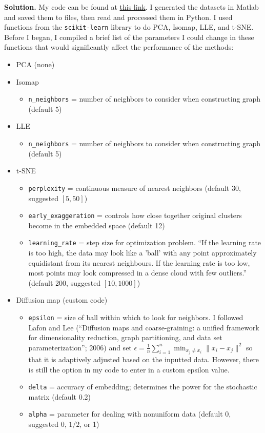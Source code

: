 \documentclass{letter}
\newcounter{problem}
\newcommand{\Solution}[1]{%
	\textbf{Solution.} #1 \par%
}
\begin{document}
    \Solution{My code can be found at \href{https://github.com/thoffman1/amsc808n}{this link}. I generated the datasets in Matlab and saved them to files, then read and processed them in Python. I used functions from the \texttt{scikit-learn} library to do PCA, Isomap, LLE, and t-SNE. Before I began, I compiled a brief list of the parameters I could change in these functions that would significantly affect the performance of the methods: \begin{itemize}
        \item PCA (none)
        \item Isomap \begin{itemize}
            \item \texttt{n\_neighbors} = number of neighbors to consider when constructing graph (default 5)
        \end{itemize}
        \item LLE \begin{itemize}
            \item \texttt{n\_neighbors} = number of neighbors to consider when constructing graph (default 5)
        \end{itemize}
        \item t-SNE \begin{itemize}
            \item \texttt{perplexity} = continuous measure of nearest neighbors (default 30, suggested $[5, 50]$)
            \item \texttt{early\_exaggeration} = controls how close together original clusters become in the embedded space (default 12)
            \item \texttt{learning\_rate} = step size for optimization problem. ``If the learning rate is too high, the data may look like a 'ball' with any point approximately equidistant from its nearest neighbours. If the learning rate is too low, most points may look compressed in a dense cloud with few outliers.'' (default 200, suggested $[10, 1000]$)
        \end{itemize}
        \item Diffusion map (custom code) \begin{itemize}
            \item \texttt{epsilon} = size of ball within which to look for neighbors. I followed Lafon and Lee (``Diffusion maps and coarse-graining: a unified framework for dimensionality reduction, graph partitioning, and data set parameterization''; 2006) and set $\epsilon = \frac{1}{n}\sum_{i=1}^n \min_{x_j \neq x_i} \|x_i - x_j\|^2$ so that it is adaptively adjusted based on the inputted data. However, there is still the option in my code to enter in a custom epsilon value.
            \item \texttt{delta} = accuracy of embedding; determines the power for the stochastic matrix (default 0.2)
            \item \texttt{alpha} = parameter for dealing with nonuniform data (default 0, suggested 0, $1/2$, or 1)
        \end{itemize}
    \end{itemize}
    
}
\end{document}
